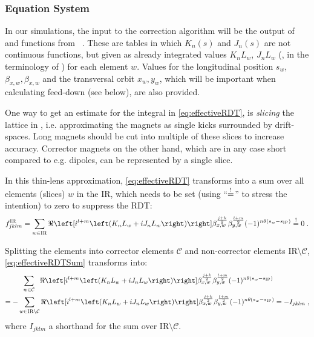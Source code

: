 

\subsubsection{Equation System}

In our simulations, the input to the correction algorithm will be the output 
of  and  functions from ~\cite{CERNMadX}.
These are tables in which $K_n(s)$ and $J_n(s)$ are not continuous functions, 
but given as already integrated values $K_nL_w$, $J_nL_w$ 
(,  in the terminology of ) for each element $w$.
Values for the longitudinal position $s_w$, $\beta_{x,w}, \beta_{x,w}$ and the transversal orbit $x_w, y_w$, which will be important 
when calculating feed-down (see below), are also provided.

One way to get an estimate for the integral in \cref{eq:effectiveRDT}, 
is \textit{slicing} the lattice in , 
i.e. approximating the magnets as single kicks surrounded by drift-spaces. 
Long magnets should be cut into multiple of these slices to increase accuracy. 
Corrector magnets on the other hand, which are in any case short compared to e.g. dipoles, 
can  be represented by a single slice.

In this thin-lens approximation, \cref{eq:effectiveRDT} transforms into a sum over all elements (slices) $w$ in the IR, 
which needs to be set (using ``$\overeq{!}$'' to stress the intention) to zero to suppress the RDT:
\begin{equation}
    \label{eq:effectiveRDTSum}
    f^\text{IR}_{jklm} =  \sum\limits_{w \in \text{IR}} 
    \ReOf{    
     i^{l+m}
     \left(K_{n}L_w + iJ_{n}L_w \right) 
    }
        \beta_{x,w}^{\frac{j+k}{2}}
        \beta_{y,w}^{\frac{l+m}{2}} 
     (-1)^{n \theta(s_w - s_\text{IP})} 
     \overeq{!} 0 
     \; .
\end{equation}
%

Splitting the elements into corrector elements $\mathcal{C}$ and non-corrector elements $\text{IR}\setminus\mathcal{C}$,
\cref{eq:effectiveRDTSum} transforms into:
\begin{equation}
    \label{eq:equationSum}
    \begin{split}
    &\;\;\sum\limits_{w \in \mathcal{C}} \;\;
    \ReOf{    
     i^{l+m}
     \left(K_{n}L_w + iJ_{n}L_w \right) 
    }
        \beta_{x,w}^{\frac{j+k}{2}}
        \beta_{y,w}^{\frac{l+m}{2}} 
     (-1)^{n \theta(s_w - s_\text{IP})} \\
     = 
    -&\sum\limits_{w \in \text{IR}\setminus\mathcal{C}} 
    \ReOf{  
     i^{l+m}
     \left(K_{n}L_w + iJ_{n}L_w \right) 
    }
        \beta_{x,w}^{\frac{j+k}{2}}
        \beta_{y,w}^{\frac{l+m}{2}} 
     (-1)^{n \theta(s_w - s_\text{IP})}
     = -I_{jklm}     
     \; ,
    \end{split}
\end{equation}
where $I_{jklm}$ a shorthand for the sum over IR$\setminus\mathcal{C}$.

